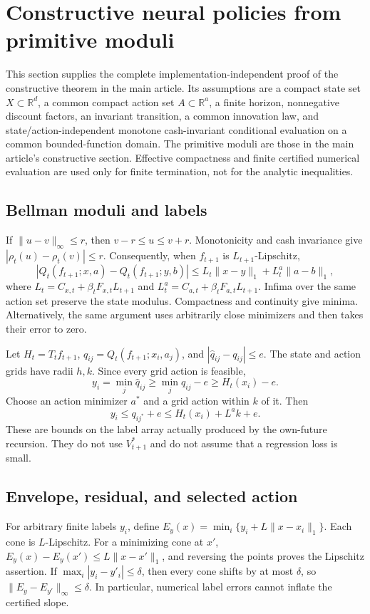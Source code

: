 \section{Constructive neural policies from primitive moduli}\label{app:constructive45}
This section supplies the complete implementation-independent proof of the constructive theorem in the main article. Its assumptions are a compact state set $X\subset\mathbb R^d$, a common compact action set $A\subset\mathbb R^a$, a finite horizon, nonnegative discount factors, an invariant transition, a common innovation law, and state/action-independent monotone cash-invariant conditional evaluation on a common bounded-function domain. The primitive moduli are those in the main article's constructive section. Effective compactness and finite certified numerical evaluation are used only for finite termination, not for the analytic inequalities.

\subsection{Bellman moduli and labels}
If $\|u-v\|_\infty\le r$, then $v-r\le u\le v+r$. Monotonicity and cash invariance give $|\rho_t(u)-\rho_t(v)|\le r$. Consequently, when $f_{t+1}$ is $L_{t+1}$-Lipschitz,
\[
 |Q_t(f_{t+1};x,a)-Q_t(f_{t+1};y,b)|
 \le L_t\|x-y\|_1+L^a_t\|a-b\|_1,
\]
where $L_t=C_{x,t}+\beta_tF_{x,t}L_{t+1}$ and $L^a_t=C_{a,t}+\beta_tF_{a,t}L_{t+1}$. Infima over the same action set preserve the state modulus. Compactness and continuity give minima. Alternatively, the same argument uses arbitrarily close minimizers and then takes their error to zero.

Let $H_t=T_tf_{t+1}$, $q_{ij}=Q_t(f_{t+1};x_i,a_j)$, and $|\widehat q_{ij}-q_{ij}|\le e$. The state and action grids have radii $h,k$. Since every grid action is feasible,
\[
 y_i=\min_j\widehat q_{ij}\ge \min_jq_{ij}-e\ge H_t(x_i)-e.
\]
Choose an action minimizer $a^*$ and a grid action within $k$ of it. Then
\[
 y_i\le q_{ij^*}+e\le H_t(x_i)+L^ak+e.
\]
These are bounds on the label array actually produced by the own-future recursion. They do not use $V_{t+1}^*$ and do not assume that a regression loss is small.

\subsection{Envelope, residual, and selected action}
For arbitrary finite labels $y_i$, define $E_y(x)=\min_i\{y_i+L\|x-x_i\|_1\}$. Each cone is $L$-Lipschitz. For a minimizing cone at $x'$, $E_y(x)-E_y(x')\le L\|x-x'\|_1$, and reversing the points proves the Lipschitz assertion. If $\max_i|y_i-y'_i|\le\delta$, then every cone shifts by at most $\delta$, so $\|E_y-E_{y'}\|_\infty\le\delta$. In particular, numerical label errors cannot inflate the certified slope.

